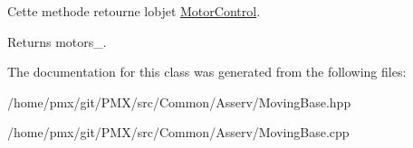 Cette methode retourne l\textquotesingle{}objet \hyperlink{classMotorControl}{Motor\+Control}. 

\begin{DoxyReturn}{Returns}
motors\+\_\+. 
\end{DoxyReturn}


The documentation for this class was generated from the following files\+:\begin{DoxyCompactItemize}
\item 
/home/pmx/git/\+P\+M\+X/src/\+Common/\+Asserv/Moving\+Base.\+hpp\item 
/home/pmx/git/\+P\+M\+X/src/\+Common/\+Asserv/Moving\+Base.\+cpp\end{DoxyCompactItemize}
